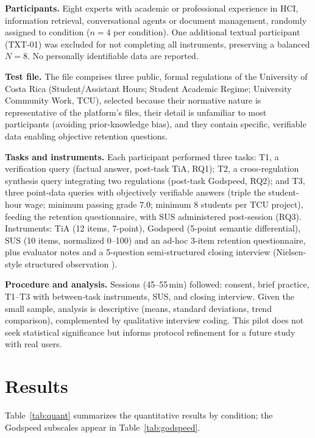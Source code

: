 \documentclass[conference]{IEEEtran}
\begin{document}
\textbf{Participants.}
Eight experts with academic or professional experience in HCI, information
retrieval, conversational agents or document management, randomly assigned to
condition ($n=4$ per condition). One additional textual participant (TXT-01) was
excluded for not completing all instruments, preserving a balanced $N=8$.
No personally identifiable data are reported.

\textbf{Test file.}
The file comprises three public, formal regulations of the University of Costa
Rica (Student/Assistant Hours; Student Academic Regime; University Community
Work, TCU), selected because their normative nature is representative of
the platform's files, their detail is unfamiliar to most participants (avoiding
prior-knowledge bias), and they contain specific, verifiable data enabling
objective retention questions.

\textbf{Tasks and instruments.}
Each participant performed three tasks: T1, a verification query
(factual answer, post-task TiA, RQ1); T2, a cross-regulation synthesis query
integrating two regulations (post-task Godspeed, RQ2); and T3, three
point-data queries with objectively verifiable answers (triple the
student-hour wage; minimum passing grade $7.0$; minimum $8$ students per TCU
project), feeding the retention questionnaire, with SUS administered post-session
(RQ3). Instruments: TiA \cite{jian2000} (12 items, 7-point), Godspeed
\cite{bartneck2009} (5-point semantic differential), SUS \cite{brooke1996}
(10 items, normalized 0--100) and an ad-hoc 3-item retention questionnaire,
plus evaluator notes and a 5-question semi-structured closing interview
(Nielsen-style structured observation \cite{nielsen1994}).

\textbf{Procedure and analysis.}
Sessions (45--55\,min) followed: consent, brief practice, T1--T3 with
between-task instruments, SUS, and closing interview. Given the small sample,
analysis is descriptive (means, standard deviations, trend comparison),
complemented by qualitative interview coding. This pilot does not seek
statistical significance but informs protocol refinement for a future study with
real users.


\section{Results}
\label{sec:results}

Table~\ref{tab:quant} summarizes the quantitative results by condition; the
Godspeed subscales appear in Table~\ref{tab:godspeed}.
\end{document}
